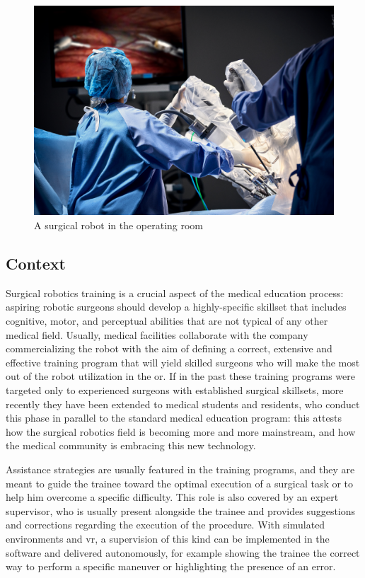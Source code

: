 \documentclass[../main.tex]{subfiles}
\begin{document}
\begin{figure}
    \centering
    \includegraphics[width=\textwidth]{images/davinci_or.jpg}
    \caption{A \davinci surgical robot in the operating room}
    \label{fig:davincior}
\end{figure}

\subsection{Context}
Surgical robotics training is a crucial aspect of the medical education process: aspiring robotic surgeons should develop a highly-specific skillset that includes cognitive, motor, and perceptual abilities that are not typical of any other medical field. Usually, medical facilities collaborate with the company commercializing the robot with the aim of defining a correct, extensive and effective training program that will yield skilled surgeons who will make the most out of the robot utilization in the \ac{or}. If in the past these training programs were targeted only to experienced surgeons with established surgical skillsets, more recently they have been extended to medical students and residents, who conduct this phase in parallel to the standard medical education program: this attests how the surgical robotics field is becoming more and more mainstream, and how the medical community is embracing this new technology. 

Assistance strategies are usually featured in the training programs, and they are meant to guide the trainee toward the optimal execution of a surgical task or to help him overcome a specific difficulty. This role is also covered by an expert supervisor, who is usually present alongside the trainee and provides suggestions and corrections regarding the execution of the procedure. With simulated environments and \ac{vr}, a supervision of this kind can be implemented in the software and delivered autonomously, for example showing the trainee the correct way to perform a specific maneuver or highlighting the presence of an error. 
\end{document}
